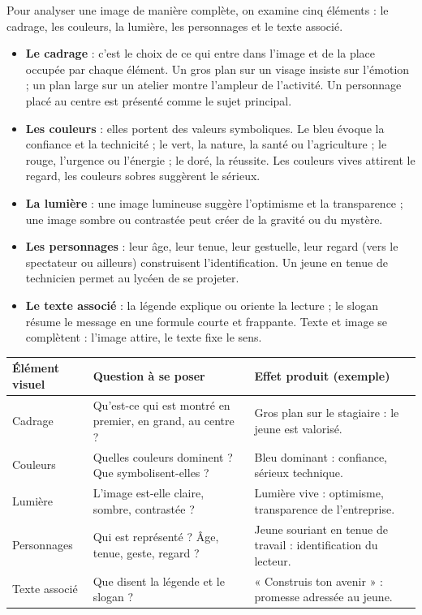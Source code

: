 \documentclass[11pt]{article}
\newcommand{\cle}[1]{{\popxbold\color{popdark}#1}}
\newcounter{popsec}
\newcounter{popsub}
\newcommand{\courssub}[1]{%
  \stepcounter{popsub}%
  \par\vspace{9pt}\noindent{\popxbold\fontsize{11.5}{13}\selectfont\color{popink}{\color{poporange}\thepopsec.\thepopsub}\hspace{6pt}#1}\par\nopagebreak\vspace{4pt}
}
\begin{document}
\courssub{Les éléments d'analyse d'une image}

Pour analyser une image de manière complète, on examine cinq éléments : le \cle{cadrage}, les \cle{couleurs}, la \cle{lumière}, les \cle{personnages} et le \cle{texte associé}.

\begin{itemize}
\item \textbf{Le cadrage} : c'est le choix de ce qui entre dans l'image et de la place occupée par chaque élément. Un gros plan sur un visage insiste sur l'émotion ; un plan large sur un atelier montre l'ampleur de l'activité. Un personnage placé au centre est présenté comme le sujet principal.
\item \textbf{Les couleurs} : elles portent des valeurs symboliques. Le bleu évoque la confiance et la technicité ; le vert, la nature, la santé ou l'agriculture ; le rouge, l'urgence ou l'énergie ; le doré, la réussite. Les couleurs vives attirent le regard, les couleurs sobres suggèrent le sérieux.
\item \textbf{La lumière} : une image lumineuse suggère l'optimisme et la transparence ; une image sombre ou contrastée peut créer de la gravité ou du mystère.
\item \textbf{Les personnages} : leur âge, leur tenue, leur gestuelle, leur regard (vers le spectateur ou ailleurs) construisent l'identification. Un jeune en tenue de technicien permet au lycéen de se projeter.
\item \textbf{Le texte associé} : la \cle{légende} explique ou oriente la lecture ; le \cle{slogan} résume le message en une formule courte et frappante. Texte et image se complètent : l'image attire, le texte fixe le sens.
\end{itemize}

\begin{center}
\begin{tabularx}{\linewidth}{|l|X|X|}
\hline
\rowcolor{popblueL} \textbf{Élément visuel} & \textbf{Question à se poser} & \textbf{Effet produit (exemple)} \\
\hline
Cadrage & Qu'est-ce qui est montré en premier, en grand, au centre ? & Gros plan sur le stagiaire : le jeune est valorisé. \\
\hline
Couleurs & Quelles couleurs dominent ? Que symbolisent-elles ? & Bleu dominant : confiance, sérieux technique. \\
\hline
Lumière & L'image est-elle claire, sombre, contrastée ? & Lumière vive : optimisme, transparence de l'entreprise. \\
\hline
Personnages & Qui est représenté ? Âge, tenue, geste, regard ? & Jeune souriant en tenue de travail : identification du lecteur. \\
\hline
Texte associé & Que disent la légende et le slogan ? & « Construis ton avenir » : promesse adressée au jeune. \\
\hline
\end{tabularx}
\end{center}
\end{document}
